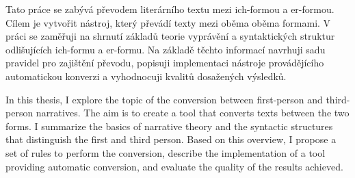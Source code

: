 Tato práce se zabývá převodem literárního textu mezi ich-formou a er-formou. Cílem je vytvořit nástroj, který převádí texty mezi oběma oběma formami. V práci se zaměřuji na shrnutí základů teorie vyprávění a syntaktických struktur odlišujících ich-formu a er-formu. Na základě těchto informací navrhuji sadu pravidel pro zajištění převodu, popisuji implementaci nástroje provádějícího automatickou konverzi a vyhodnocuji kvalitů dosažených výsledků.

In this thesis, I explore the topic of the conversion between first-person and third-person narratives. The aim is to create a tool that converts texts between the two forms. I summarize the basics of narrative theory and the syntactic structures that distinguish the first and third person. Based on this overview, I propose a set of rules to perform the conversion, describe the implementation of a tool providing automatic conversion, and evaluate the quality of the results achieved.

